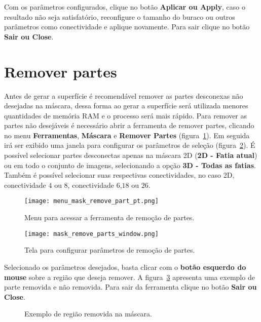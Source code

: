 Com os parâmetros configurados, clique no botão \textbf{Aplicar ou Apply}, caso o resultado não seja satisfatório, reconfigure o tamanho do buraco ou outros parâmetros como conectividade e aplique novamente. Para sair clique no botão \textbf{Sair ou Close}.

\section{Remover partes}

Antes de gerar a superfície é recomendável remover as partes desconexas não desejadas na máscara, dessa forma ao gerar a superfície será utilizada menores quantidades de memória RAM e o processo será mais rápido. Para remover as partes não desejáveis é necessário abrir a ferramenta de remover partes, clicando no menu \textbf{Ferramentas}, \textbf{Máscara} e \textbf{Remover Partes} (figura~\ref{fig:menu_mask_remove_part}). Em seguida irá ser exibido uma janela para configurar os parâmetros de seleção (figura~\ref{fig:mask_remove_parts_window}). É possível selecionar partes desconectas apenas na máscara 2D (\textbf{2D - Fatia atual}) ou em todo o conjunto de imagens, selecionando a opção \textbf{3D - Todas as fatias}. Também é possível selecionar suas respectivas conectividades, no caso 2D, conectividade $4$ ou $8$, conectividade $6$,$18$ ou $26$.

\begin{figure}[!htb]
\centering
\texttt{[image: menu\_mask\_remove\_part\_pt.png]}
\caption{Menu para acessar a ferramenta de remoção de partes.}
\label{fig:menu_mask_remove_part}
\end{figure}

\begin{figure}[!htb]
\centering
\texttt{[image: mask\_remove\_parts\_window.png]}
\caption{Tela para configurar parâmetros de remoção de partes.}
\label{fig:mask_remove_parts_window}
\end{figure}

Selecionado os parâmetros desejados, basta clicar com o \textbf{botão esquerdo do mouse} sobre a região que deseja remover. A figura~\ref{fig:mask_removed_part} apresenta uma exemplo de parte removida e não removida. Para sair da ferramenta clique no botão \textbf{Sair ou Close}.

\begin{figure}[!htb]
  \centering
    \qquad
  \hfill
  \caption{Exemplo de região removida na máscara.}
  \label{fig:mask_removed_part}
\end{figure}

